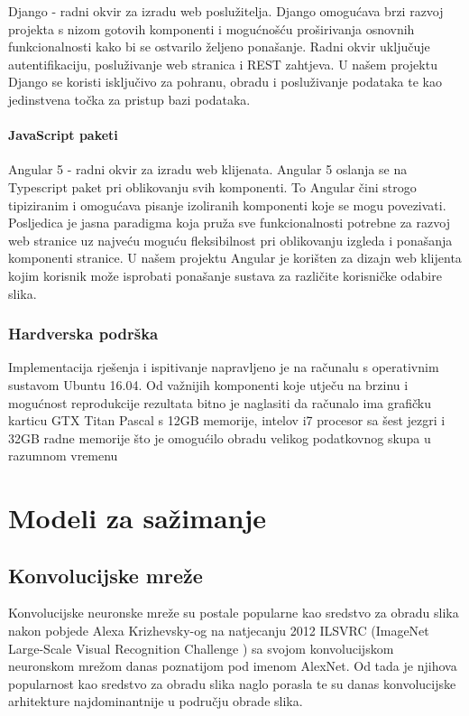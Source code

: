 \documentclass[times, utf8, proizvoljni, numeric]{fer}
\begin{document}
Django \cite{django}- radni okvir za izradu web poslužitelja. Django omogućava brzi razvoj projekta s nizom gotovih komponenti i mogućnošću proširivanja osnovnih funkcionalnosti kako bi se ostvarilo željeno ponašanje. Radni okvir uključuje autentifikaciju, posluživanje web stranica i REST zahtjeva. U našem projektu Django se koristi isključivo za pohranu, obradu i posluživanje podataka te kao jedinstvena točka za pristup bazi podataka. 


\subsubsection{JavaScript paketi}

Angular 5 \cite{angular} - radni okvir za izradu web klijenata. Angular 5 oslanja se na Typescript paket pri oblikovanju svih komponenti. To Angular čini strogo tipiziranim i omogućava pisanje izoliranih komponenti koje se mogu povezivati. Posljedica je jasna paradigma koja pruža sve funkcionalnosti potrebne za razvoj web stranice uz najveću moguću fleksibilnost pri oblikovanju izgleda i ponašanja komponenti stranice. U našem projektu Angular je korišten za dizajn web klijenta kojim korisnik može isprobati ponašanje sustava za različite korisničke odabire slika.



\subsection{Hardverska podrška}
Implementacija rješenja i ispitivanje napravljeno je na računalu s operativnim sustavom Ubuntu 16.04. Od važnijih komponenti koje utječu na brzinu i mogućnost reprodukcije rezultata bitno je naglasiti da računalo ima grafičku karticu GTX Titan Pascal s 12GB memorije, intelov i7 procesor sa šest jezgri i 32GB radne memorije što je omogućilo obradu velikog podatkovnog skupa u razumnom vremenu

\chapter{Modeli za sažimanje}

\section{Konvolucijske mreže}

Konvolucijske neuronske mreže su postale popularne kao sredstvo za obradu slika nakon pobjede Alexa Krizhevsky-og na natjecanju 2012 ILSVRC (ImageNet Large-Scale Visual Recognition Challenge \cite{ILSVRC15}) sa svojom konvolucijskom neuronskom mrežom danas poznatijom pod imenom AlexNet. Od tada je njihova popularnost kao sredstvo za obradu slika naglo porasla te su danas konvolucijske arhitekture najdominantnije u području obrade slika.
\end{document}
